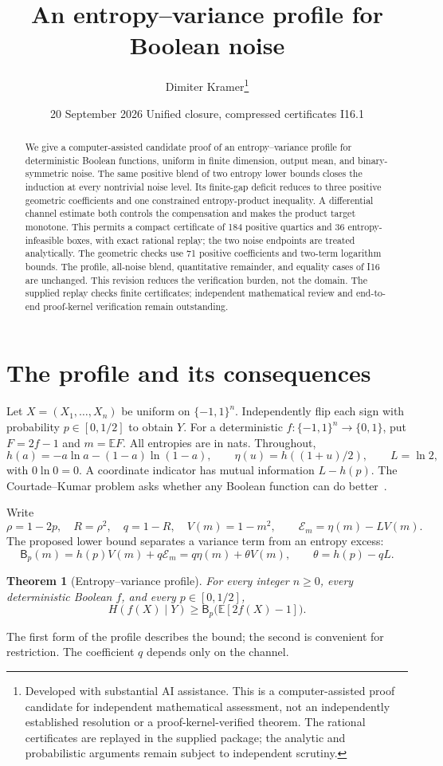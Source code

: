 \documentclass[11pt]{article}
\title{An entropy--variance profile for Boolean noise}
\author{Dimiter Kramer\thanks{Developed with substantial AI assistance. This is a computer-assisted proof candidate for independent mathematical assessment, not an independently established resolution or a proof-kernel-verified theorem. The rational certificates are replayed in the supplied package; the analytic and probabilistic arguments remain subject to independent scrutiny.}}
\date{20 September 2026 \quad Unified closure, compressed certificates I16.1}
\newtheorem{theorem}{Theorem}[section]
\theoremstyle{remark}\newtheorem{remark}[theorem]{Remark}
\newcommand{\E}{\mathbb E}\newcommand{\PP}{\mathbb P}\newcommand{\dd}{\,\mathrm d}
\newcommand{\Bprof}{\mathsf B_p}\newcommand{\Pprof}{\Phi_p}
\numberwithin{equation}{section}
\begin{document}
\maketitle
\begin{abstract}
We give a computer-assisted candidate proof of an entropy--variance profile
for deterministic Boolean functions, uniform in finite dimension, output mean,
and binary-symmetric noise. The same positive blend of two entropy lower bounds
closes the induction at every nontrivial noise level. Its finite-gap deficit
reduces to three positive geometric coefficients and one constrained
entropy-product inequality. A differential channel estimate both controls the
compensation and makes the product target monotone. This permits a compact
certificate of 184 positive quartics and 36 entropy-infeasible boxes, with exact
rational replay; the two noise endpoints are treated analytically. The geometric
checks use 71 positive coefficients and two-term logarithm bounds.
The profile, all-noise blend, quantitative remainder, and equality cases of I16
are unchanged. This revision reduces the verification burden, not the domain.
The supplied replay checks finite certificates; independent mathematical review
and end-to-end proof-kernel verification remain outstanding.
\end{abstract}
\section{The profile and its consequences}\label{sec:intro}
Let $X=(X_1,\ldots,X_n)$ be uniform on $\{-1,1\}^n$. Independently flip
each sign with probability $p\in[0,1/2]$ to obtain $Y$. For a deterministic
$f:\{-1,1\}^n\to\{0,1\}$, put $F=2f-1$ and $m=\E F$. All entropies
are in nats. Throughout,
\[
 h(a)=-a\ln a-(1-a)\ln(1-a),\qquad
 \eta(u)=h((1+u)/2),\qquad L=\ln2,
\]
with $0\ln0=0$. A coordinate indicator has mutual information $L-h(p)$.
The Courtade--Kumar problem asks whether any Boolean function can do better~\cite{CK}.

Write
\[
 \rho=1-2p,\quad R=\rho^2,\quad q=1-R,\quad V(m)=1-m^2,
 \qquad \mathscr E_m=\eta(m)-LV(m).
\]
The proposed lower bound separates a variance term from an entropy excess:
\begin{equation}\label{eq:profile}
 \boxed{\Bprof(m)=h(p)V(m)+q\mathscr E_m
       =q\eta(m)+\theta V(m),\qquad \theta=h(p)-qL.}
\end{equation}
\begin{samepage}\begin{theorem}[Entropy--variance profile]\label{thm:main}
For every integer $n\ge0$, every deterministic Boolean $f$, and every
$p\in[0,1/2]$,
\begin{equation}\label{eq:main-profile}
 H(f(X)\mid Y)\ge\Bprof\bigl(\E[2f(X)-1]\bigr).
\end{equation}
\end{theorem}\end{samepage}
The first form of the profile describes the bound; the second is convenient
for restriction. The coefficient $q$ depends only on the channel.
\end{document}
